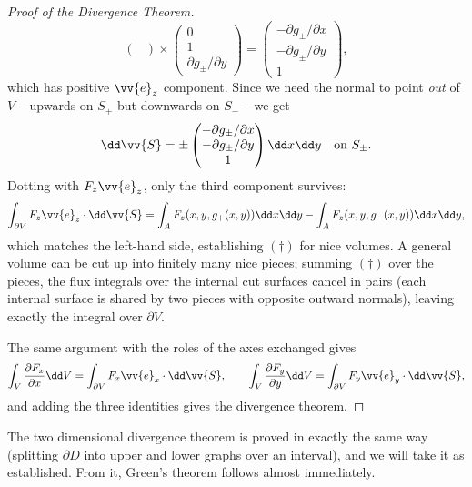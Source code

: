 \begin{proof}[Proof of the Divergence Theorem]
$$\begin{pmatrix}
	\end{pmatrix} \times \begin{pmatrix}
		0 \\ 1 \\ \partial g_\pm / \partial y
	\end{pmatrix} = \begin{pmatrix}
		-\partial g_\pm/\partial x \\
		-\partial g_\pm/\partial y \\
		1
	\end{pmatrix},
	$$
	which has positive $\vv{e}_z$ component. Since we need the normal to point \emph{out} of $V$ -- upwards on $S_+$ but downwards on $S_-$ -- we get
	$$
	\dd \vv{S} = \pm \begin{pmatrix}
		- \partial g_\pm/\partial x \\
		- \partial g_\pm/\partial y \\
		1
	\end{pmatrix} \dd x \dd y \quad \text{on } S_\pm.
	$$
	Dotting with $F_z \vv{e}_z$, only the third component survives:
	$$
	\int_{\partial V} F_z \vv{e}_z \cdot \dd \vv{S} = \int_A F_z(x, y, g_+(x, y)) \dd x \dd y - \int_A F_z(x, y, g_-(x, y)) \dd x \dd y,
	$$
	which matches the left-hand side, establishing $(\dagger)$ for nice volumes. A general volume can be cut up into finitely many nice pieces; summing $(\dagger)$ over the pieces, the flux integrals over the internal cut surfaces cancel in pairs (each internal surface is shared by two pieces with opposite outward normals), leaving exactly the integral over $\partial V$.

	The same argument with the roles of the axes exchanged gives
	$$
	\int_V \frac{\partial F_x}{\partial x} \dd V = \int_{\partial V} F_x \vv{e}_x \cdot \dd \vv{S}, \quad \quad \int_V \frac{\partial F_y}{\partial y} \dd V = \int_{\partial V} F_y \vv{e}_y \cdot \dd \vv{S},
	$$
	and adding the three identities gives the divergence theorem.
\end{proof}

The two dimensional divergence theorem is proved in exactly the same way (splitting $\partial D$ into upper and lower graphs over an interval), and we will take it as established. From it, Green's theorem follows almost immediately.

